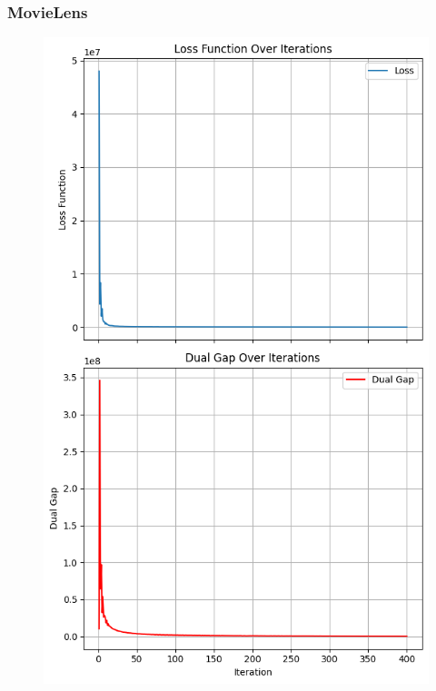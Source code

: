 \documentclass[12pt]{beamer}
\begin{document}
\begin{frame}
    \frametitle{MovieLens}
    \vspace{-0.5cm}
    \begin{figure}[H]
        \centering
        \hspace{-0.55cm}
        \includegraphics[height=0.75\textheight]{image/movielens_loss_gap_diminishing.png}
        \hspace{-0.2cm}

\end{figure}
\end{frame}
\end{document}

